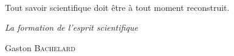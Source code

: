 ~
\vfill

\hfill Tout savoir scientifique doit être à tout moment reconstruit.

\hfill \emph{La formation de l’esprit scientifique}

\hfill Gaston \textsc{Bachelard}
\vfill
\vfill
\vfill